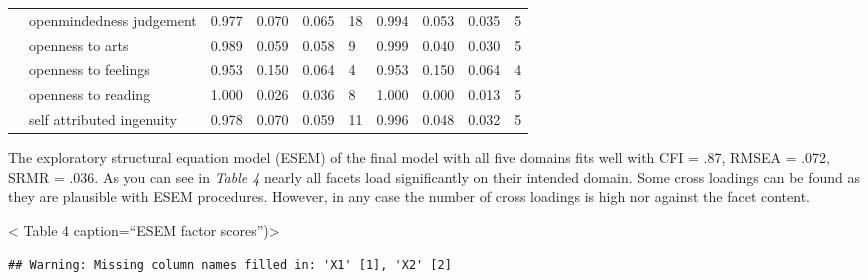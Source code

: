 \documentclass[man]{apa6}
\theoremstyle{definition}
\theoremstyle{definition}
\theoremstyle{definition}
\theoremstyle{remark}
\begin{document}
\begin{table}
{\begin{tabular}[t]{llllllllll}
 & openmindedness judgement & 0.977 & 0.070 & 0.065 & 18 & 0.994 & 0.053 & 0.035 & 5\\
 & openness to arts & 0.989 & 0.059 & 0.058 & 9 & 0.999 & 0.040 & 0.030 & 5\\
 & openness to feelings & 0.953 & 0.150 & 0.064 & 4 & 0.953 & 0.150 & 0.064 & 4\\
 & openness to reading & 1.000 & 0.026 & 0.036 & 8 & 1.000 & 0.000 & 0.013 & 5\\
 & self attributed ingenuity & 0.978 & 0.070 & 0.059 & 11 & 0.996 & 0.048 & 0.032 & 5\\
\bottomrule
\end{tabular}}
\end{table}

The exploratory structural equation model (ESEM) of the final model with
all five domains fits well with CFI = .87, RMSEA = .072, SRMR = .036. As
you can see in \emph{Table 4} nearly all facets load significantly on
their intended domain. Some cross loadings can be found as they are
plausible with ESEM procedures. However, in any case the number of cross
loadings is high nor against the facet content.

\textless{} Table 4 caption=\enquote{ESEM factor scores})\textgreater{}

\begin{verbatim}
## Warning: Missing column names filled in: 'X1' [1], 'X2' [2]
\end{verbatim}
\end{document}
